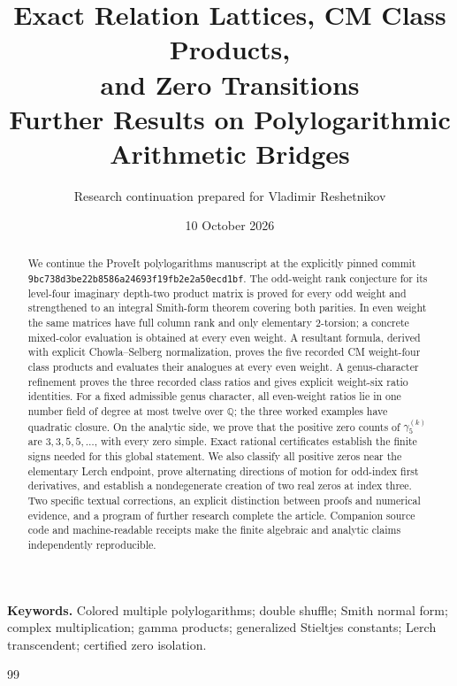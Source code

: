 \documentclass[11pt,letterpaper]{article}
\title{\bfseries Exact Relation Lattices, CM Class Products,\\
and Zero Transitions\\[5pt]
\large Further Results on Polylogarithmic Arithmetic Bridges}
\author{Research continuation prepared for Vladimir Reshetnikov}
\date{10 October 2026}
\numberwithin{equation}{section}
\theoremstyle{definition}
\theoremstyle{remark}
\begin{document}
\maketitle
\thispagestyle{empty}
\begin{abstract}
We continue the ProveIt polylogarithms manuscript at the explicitly pinned
commit \texttt{9bc738d3be22b8586a24693f19fb2e2a50ecd1bf}.
The odd-weight rank conjecture for its level-four imaginary depth-two
product matrix is proved for every odd weight and strengthened to an
integral Smith-form theorem covering both parities. In even weight the same matrices have full column
rank and only elementary $2$-torsion; a concrete mixed-color evaluation
is obtained at every even weight. A resultant formula, derived with
explicit Chowla--Selberg normalization, proves the five recorded CM
weight-four class products and evaluates their analogues at every even
weight. A genus-character refinement proves the three recorded class
ratios and gives explicit weight-six ratio identities. For a fixed admissible
genus character, all even-weight ratios lie in one number field of degree at
most twelve over $\mathbb Q$; the three worked examples have quadratic closure. On the analytic side, we prove that the positive zero counts of
$\gamma_5^{(k)}$ are $3,3,5,5,\ldots$, with every zero simple. Exact
rational certificates establish the finite signs needed for this global
statement. We also classify all positive zeros near the elementary Lerch
endpoint, prove alternating directions of motion for odd-index first
derivatives, and establish a nondegenerate creation of two real zeros at
index three. Two specific textual corrections, an explicit distinction
between proofs and numerical evidence, and a program of further research
complete the article. Companion source code and machine-readable receipts
make the finite algebraic and analytic claims independently reproducible.
\end{abstract}

\vspace{5pt}
\noindent\textbf{Keywords.} Colored multiple polylogarithms; double shuffle;
Smith normal form; complex multiplication; gamma products; generalized
Stieltjes constants; Lerch transcendent; certified zero isolation.

\clearpage
\tableofcontents
\clearpage








\appendix

\clearpage
\begingroup
\small
\begin{thebibliography}{99}
\raggedright

\end{thebibliography}
\endgroup
\end{document}
